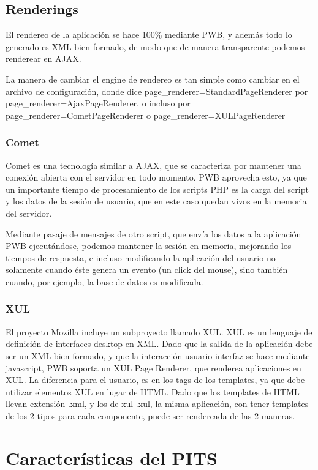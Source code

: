 \subsection{Renderings}
\label{sub-render}
El rendereo de la aplicación se hace 100\% mediante PWB, y además todo lo generado es XML bien formado, de
modo que de manera transparente podemos renderear en AJAX.

La manera de cambiar el engine de rendereo es tan simple como cambiar en el archivo de configuración, donde
dice page\_renderer=StandardPageRenderer por page\_renderer=AjaxPageRenderer, o incluso por page\_renderer=CometPageRenderer
o page\_renderer=XULPageRenderer

\subsubsection{Comet}

Comet es una tecnología similar a AJAX, que se caracteriza por mantener una conexión abierta con el servidor
en todo momento. PWB aprovecha esto, ya que un importante tiempo de procesamiento de los scripts PHP es la
carga del script y los datos de la sesión de usuario, que en este caso quedan vivos en la memoria del servidor.

Mediante pasaje de mensajes de otro script, que envía los datos a la aplicación PWB ejecutándose, podemos
mantener la sesión en memoria, mejorando los tiempos de respuesta, e incluso modificando la aplicación del
usuario no solamente cuando éste genera un evento (un click del mouse), sino también cuando, por ejemplo, la base
de datos es modificada.

\subsubsection{XUL}

El proyecto Mozilla incluye un subproyecto llamado XUL. XUL es un lenguaje de definición de interfaces desktop
en XML. Dado que la salida de la aplicación debe ser un XML bien formado, y que la interacción usuario-interfaz
se hace mediante javascript, PWB soporta un XUL Page Renderer, que renderea aplicaciones en XUL. La
diferencia para el usuario, es en los tags de los templates, ya que debe utilizar elementos XUL en lugar de
HTML. Dado que los templates de HTML llevan extensión .xml, y los de xul .xul, la misma aplicación, con tener
templates de los 2 tipos para cada componente, puede ser rendereada de las 2 maneras.

\section{Características del PITS}

